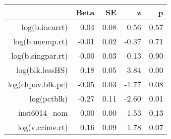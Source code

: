 \begin{table}[ht]
\centering
\begin{tabular}{rrrrr}
  \hline
 & Beta & SE & z & p \\ 
  \hline
log(b.incarrt) & 0.04 & 0.08 & 0.56 & 0.57 \\ 
  log(b.unemp.rt) & -0.01 & 0.02 & -0.37 & 0.71 \\ 
  log(b.singpar.rt) & -0.00 & 0.03 & -0.13 & 0.90 \\ 
  log(blk.lessHS) & 0.18 & 0.05 & 3.84 & 0.00 \\ 
  log(chpov.blk.pc) & -0.05 & 0.03 & -1.77 & 0.08 \\ 
  log(pctblk) & -0.27 & 0.11 & -2.60 & 0.01 \\ 
  inst6014\_nom & 0.00 & 0.00 & 1.53 & 0.13 \\ 
  log(v.crime.rt) & 0.16 & 0.09 & 1.78 & 0.07 \\ 
   \hline
\end{tabular}
\end{table}
